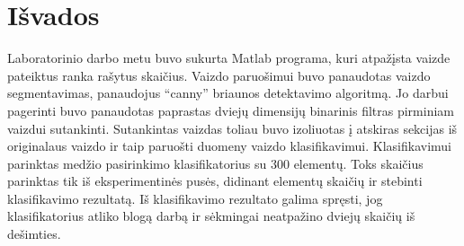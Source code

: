\documentclass[11pt, a4paper, lithuanian]{article}
\begin{document}
    \section{Išvados}

    Laboratorinio darbo metu buvo sukurta Matlab programa, kuri atpažįsta vaizde pateiktus ranka rašytus skaičius. Vaizdo paruošimui buvo panaudotas vaizdo segmentavimas, panaudojus ``canny'' briaunos detektavimo algoritmą. Jo darbui pagerinti buvo panaudotas paprastas dviejų dimensijų binarinis filtras pirminiam vaizdui sutankinti. Sutankintas vaizdas toliau buvo izoliuotas į atskiras sekcijas iš originalaus vaizdo ir taip paruošti duomeny vaizdo klasifikavimui. Klasifikavimui parinktas medžio pasirinkimo klasifikatorius su $300$ elementų. Toks skaičius parinktas tik iš eksperimentinės pusės, didinant elementų skaičių ir stebinti klasifikavimo rezultatą. Iš klasifikavimo rezultato galima spręsti, jog klasifikatorius atliko blogą darbą ir sėkmingai neatpažino dviejų skaičių iš dešimties.

    
    
\end{document}
